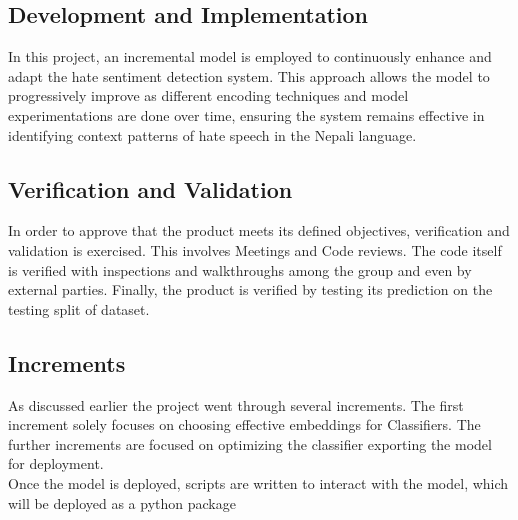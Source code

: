 \subsection{Development and Implementation}
In this project, an incremental model is employed to continuously enhance and adapt the hate sentiment detection system. This approach allows the model to progressively improve as different encoding techniques and model experimentations are done over time, ensuring the system remains effective in identifying context patterns of hate speech in the Nepali language.
\begin{figure}[h]

\end{figure}
\subsection{Verification and Validation}
In order to approve that the product meets its defined objectives, verification and validation is exercised. This involves Meetings and Code reviews. 
The code itself is verified with inspections and walkthroughs among the group and even by external parties. Finally, the product is verified by testing its prediction on the testing split of dataset.
\subsection{Increments}
As discussed earlier the project went through several increments. The first increment solely focuses on choosing effective embeddings for Classifiers. The further increments are focused on optimizing the classifier exporting the model for deployment.\\
Once the model is deployed, scripts are written to interact with the model, which will be deployed as a python package

